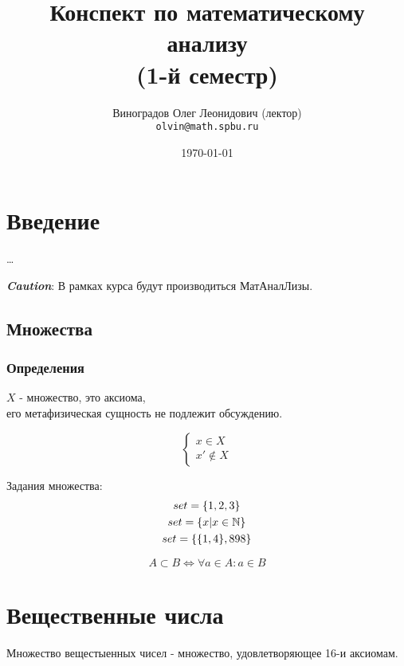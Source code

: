 \documentclass[12pt, a4paper]{article}
\title{Конспект по математическому анализу \\(1-й семестр)}
\author{
  \vova
  \and
  Виноградов Олег Леонидович (лектор)\\
  \texttt{olvin@math.spbu.ru}
}
\date{\today}
\begin{document}
  \maketitle
  \newpage
  \tableofcontents
  \newpage


  \section{Введение}

  \dots

  \textit{\textbf{Caution}}: В рамках курса будут производиться МатАналЛизы.
	


  \subsection{Множества}


  \subsubsection{Определения} 

  \begin{definition}[Множество]
  $X$ - множество, это аксиома, \\
  его метафизическая сущность не подлежит обсуждению.  
  \end{definition}

  \begin{equation}
  \begin{cases}
    x \in X \\
    x' \notin X
  \end{cases}
  \end{equation}

  \begin{example}
  Задания множества: 
  \begin{gather}
    set = \{1, 2, 3\} \\
    set = \{x | x \in {\mathbb{N}}\} \\
    set = \{\{1, 4\}, 898\}
  \end{gather}
  \end{example}

  \begin{definition}[Подмножество]
  \begin{equation}
    A \subset B \Longleftrightarrow \forall a \in A: a \in B
  \end{equation}
  \end{definition}

  \section{Вещественные числа}
  Множество вещестыенных чисел - множество, 
  удовлетворяющее 16-и аксиомам.
\end{document}
